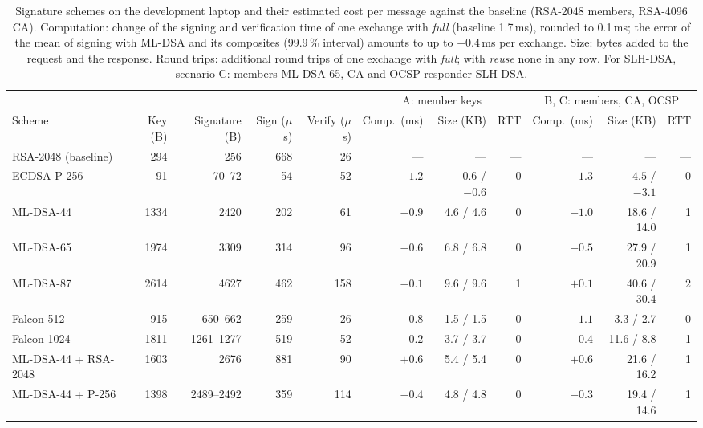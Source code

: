 \documentclass[conference,a4paper]{IEEEtran}
\newcommand{\newtext}[1]{{\color{blue}#1}}
\begin{document}
{\begin{table}[!tb]
\centering\footnotesize
\caption{Signature schemes on the development laptop and their estimated cost per message against the
baseline (RSA-2048 members, RSA-4096 CA). Computation: change of the signing and verification time
of one exchange with \emph{full} (baseline 1.7\,ms)\newtext{, rounded to 0.1\,ms; the error of the
mean of signing with ML-DSA and its composites (99.9\,\% interval) amounts to up to $\pm$0.4\,ms per
exchange}. Size: bytes added to the request and the
response. Round trips: additional round trips of one exchange with \emph{full}; with \emph{reuse} none
in any row. For SLH-DSA, scenario C: members ML-DSA-65, CA and OCSP responder SLH-DSA.}
\label{tab:pq}
\color{blue}
\setlength{\tabcolsep}{3.5pt}
\begin{tabular}{@{}lrrrrrrrrrr@{}}
\toprule
& & & & & \multicolumn{3}{c}{A: member keys} & \multicolumn{3}{c}{B, C: members, CA, OCSP} \\
\cmidrule(lr){6-8}\cmidrule(l){9-11}
Scheme & Key (B) & Signature (B) & Sign ($\mu$s) & Verify ($\mu$s) & Comp.\ (ms) & Size (KB) & RTT
& Comp.\ (ms) & Size (KB) & RTT \\
\midrule
RSA-2048 (baseline) & 294 & 256 & 668 & 26 & --- & --- & --- & --- & --- & --- \\
ECDSA P-256 & 91 & 70--72 & 54 & 52 & \newtext{$-1.2$} & $-0.6$ / $-0.6$ & 0 & \newtext{$-1.3$} & $-4.5$ / $-3.1$ & \newtext{0} \\
ML-DSA-44 & 1334 & 2420 & 202 & 61 & \newtext{$-0.9$} & 4.6 / 4.6 & 0 & \newtext{$-1.0$} & 18.6 / 14.0 & 1 \\
ML-DSA-65 & 1974 & 3309 & 314 & 96 & \newtext{$-0.6$} & 6.8 / 6.8 & 0 & \newtext{$-0.5$} & 27.9 / 20.9 & 1 \\
ML-DSA-87 & 2614 & 4627 & 462 & 158 & \newtext{$-0.1$} & 9.6 / 9.6 & 1 & \newtext{$+0.1$} & 40.6 / 30.4 & 2 \\
Falcon-512 & 915 & 650--662 & 259 & 26 & \newtext{$-0.8$} & 1.5 / 1.5 & 0 & \newtext{$-1.1$} & \newtext{3.3 / 2.7} & 0 \\
Falcon-1024 & 1811 & 1261--1277 & 519 & 52 & \newtext{$-0.2$} & 3.7 / 3.7 & 0 & \newtext{$-0.4$} & 11.6 / 8.8 & 1 \\
ML-DSA-44 + RSA-2048 & 1603 & 2676 & 881 & 90 & \newtext{$+0.6$} & 5.4 / 5.4 & 0 & \newtext{$+0.6$} & 21.6 / 16.2 & 1 \\
ML-DSA-44 + P-256 & 1398 & 2489--2492 & 359 & 114 & \newtext{$-0.4$} & 4.8 / 4.8 & 0 & \newtext{$-0.3$} & 19.4 / 14.6 & 1 \\

\end{tabular}
\end{table}}
\end{document}
